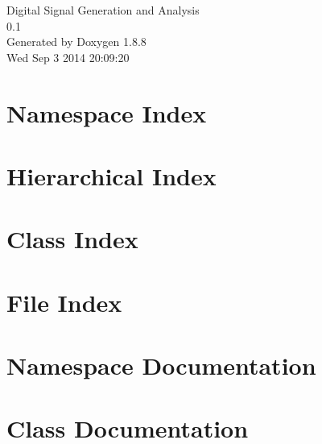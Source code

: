 \documentclass[twoside]{book}
\newcommand{\+}{\discretionary{\mbox{\scriptsize$\hookleftarrow$}}{}{}}
\newcommand{\clearemptydoublepage}{%
  \newpage{\pagestyle{empty}\cleardoublepage}%
}
\begin{document}
\hypersetup{pageanchor=false,
             bookmarks=true,
             bookmarksnumbered=true,
             pdfencoding=unicode
            }
\begin{titlepage}
\vspace*{7cm}
\begin{center}%
{\Large Digital Signal Generation and Analysis \\[1ex]\large 0.\+1 }\\
\vspace*{1cm}
{\large Generated by Doxygen 1.8.8}\\
\vspace*{0.5cm}
{\small Wed Sep 3 2014 20:09:20}\\
\end{center}
\end{titlepage}
\clearemptydoublepage
\tableofcontents
\clearemptydoublepage
{}
\hypersetup{pageanchor=true}

\chapter{Namespace Index}

\chapter{Hierarchical Index}

\chapter{Class Index}

\chapter{File Index}

\chapter{Namespace Documentation}



\chapter{Class Documentation}


















\end{document}
